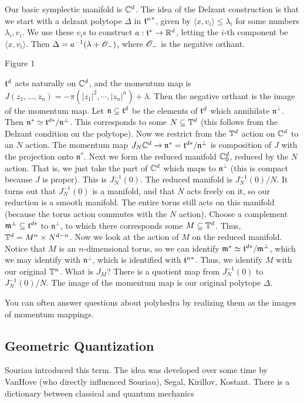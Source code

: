  \setcounter{lecture}{20}

 Our basic symplectic manifold is $\mathbb{C}^d$.  The idea of the Delzant construction is
 that we start with a delzant polytope $\Delta$ in ${\mathfrak{t}^n}^*$, given by $\langle
 x,v_i\rangle \le \lambda_i$ for some numbers $\lambda_i, v_i$.  We use these $v_i$s
 to construct $a:\mathfrak{t}^* \to \mathbb{R}^d$, letting the $i$-th component be $\langle
 x,v_i\rangle$.  Then $\Delta = a^{-1}(\lambda+\mathscr{O}_-)$, where $\mathscr{O}_-$ is the negative
 orthant.

 Figure 1

 \def\n{\mathfrak{n}}

 $\mathfrak{t}^d$ acts naturally on $\mathbb{C}^d$, and the momentum map is $J(z_1,\dots,
 z_n)=-\pi(|z_1|^2,\cdots ,|z_n|^n)+\lambda$.  Then the negative orthant is the image
 of the momentum map.  Let $\n\subseteq \t^d$ be the elements of $\mathfrak{t}^d$ which
 annihilate $\n^\perp$. Then $\n^*\simeq \t^{d*}/\n^\perp$.  This corresponds to some
 $N\subseteq \mathbb{T}^d$ (this follows from the Delzant condition on the polytope).  Now we
 restrict from the $\mathbb{T}^d$ action on $\mathbb{C}^d$ to an $N$ action.  The momentum map
 $J_N\CC^d\to \n^*=\t^{d*}/\n^\perp$ is composition of $J$ with the projection onto
 $\n^*$.  Next we form the reduced manifold $\mathbb{C}^d_0$, reduced by the $N$ action.
 That is, we just take the part of $\mathbb{C}^d$ which maps to $\n^\perp$ (this is compact
 because $J$ is proper).  This is $J_N^{-1}(0)$.  The reduced manifold is
 $J_N^{-1}(0)/N$.  It turns out that $J_N^{-1}(0)$ is a manifold, and that $N$ acts
 freely on it, so our reduction is a smooth manifold.  The entire torus still acts on
 this manifold (because the torus action commutes with the $N$ action).  Choose a
 complement $\mathfrak{m}^\perp\subseteq \mathfrak{t}^{d*}$ to $\n^\perp$, to which there corresponds some
 $M\subseteq \mathbb{T}^d$.  Thus, $\mathbb{T}^d=M^n\times N^{d-n}$.  Now we look at the action of
 $M$ on the reduced manifold.  Notice that $M$ is an $n$-dimensional torus, so we can
 identify $\mathfrak{m}^*\simeq \mathfrak{t}^{d*}/\mathfrak{m}^\perp$, which we may identify with $\n^\perp$, which
 is identified with $\mathfrak{t}^{n*}$.  Thus, we identify $M$ with our original $\mathbb{T}^n$.  What
 is $J_M$?  There is a quotient map from $J_N^{-1}(0)$ to $J_N^{-1}(0)/N$.  The image
 of the momentum map is our original polytope $\Delta$.

 You can often answer questions about polyhedra by realizing them as the images of
 momentum mappings.

 \subsection*{Geometric Quantization}
 Souriau introduced this term.  The idea was developed over some time by VanHove (who
 directly influenced Souriau), Segal, Kirillov, Kostant.  There is a dictionary
 between classical and quantum mechanics

